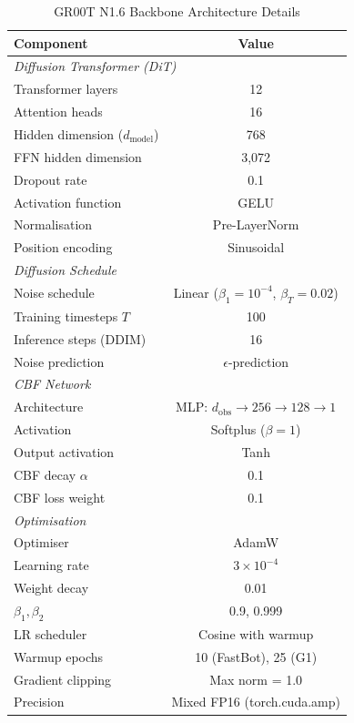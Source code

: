\documentclass[conference]{IEEEtran}
\begin{document}
\begin{table}[h]
\centering
\caption{GR00T N1.6 Backbone Architecture Details}
\begin{tabular}{@{}lc@{}}
\toprule
\textbf{Component} & \textbf{Value} \\
\midrule
\multicolumn{2}{l}{\textit{Diffusion Transformer (DiT)}} \\
\quad Transformer layers & 12 \\
\quad Attention heads & 16 \\
\quad Hidden dimension ($d_\text{model}$) & 768 \\
\quad FFN hidden dimension & 3{,}072 \\
\quad Dropout rate & 0.1 \\
\quad Activation function & GELU \\
\quad Normalisation & Pre-LayerNorm \\
\quad Position encoding & Sinusoidal \\
\midrule
\multicolumn{2}{l}{\textit{Diffusion Schedule}} \\
\quad Noise schedule & Linear ($\beta_1{=}10^{-4}$, $\beta_T{=}0.02$) \\
\quad Training timesteps $T$ & 100 \\
\quad Inference steps (DDIM) & 16 \\
\quad Noise prediction & $\epsilon$-prediction \\
\midrule
\multicolumn{2}{l}{\textit{CBF Network}} \\
\quad Architecture & MLP: $d_\text{obs} \to 256 \to 128 \to 1$ \\
\quad Activation & Softplus ($\beta = 1$) \\
\quad Output activation & Tanh \\
\quad CBF decay $\alpha$ & 0.1 \\
\quad CBF loss weight & 0.1 \\
\midrule
\multicolumn{2}{l}{\textit{Optimisation}} \\
\quad Optimiser & AdamW \\
\quad Learning rate & $3 \times 10^{-4}$ \\
\quad Weight decay & 0.01 \\
\quad $\beta_1, \beta_2$ & 0.9, 0.999 \\
\quad LR scheduler & Cosine with warmup \\
\quad Warmup epochs & 10 (FastBot), 25 (G1) \\
\quad Gradient clipping & Max norm = 1.0 \\
\quad Precision & Mixed FP16 (torch.cuda.amp) \\
\bottomrule
\end{tabular}
\end{table}
\end{document}
